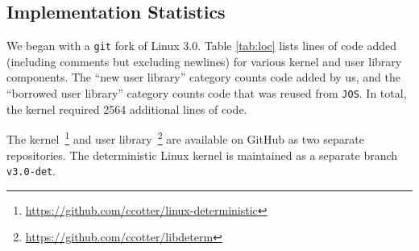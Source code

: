 \subsection{Implementation Statistics}
We began with a {\tt git} fork of Linux 3.0. Table \ref{tab:loc} lists lines
of code added (including comments but excluding newlines) for various kernel and
user library components. The ``new user library'' category counts code added by
us, and the ``borrowed user library'' category counts code that was reused from
{\tt JOS}. In total, the kernel required 2564 additional lines of code.



The kernel~\footnote{
\url{https://github.com/ccotter/linux-deterministic}} and user
library~\footnote{\url{https://github.com/ccotter/libdeterm}} are available on
GitHub as two separate repositories. The deterministic Linux kernel
is maintained as a separate branch {\tt v3.0-det}.

\endinput

